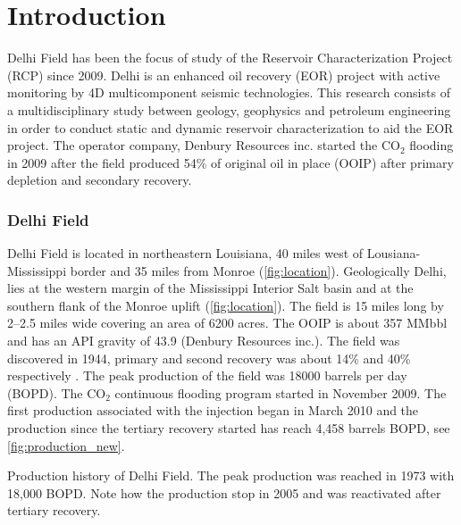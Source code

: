 \chapter{Introduction}
Delhi Field has been the focus of study of the Reservoir Characterization Project (RCP)
since 2009. Delhi is an enhanced oil recovery (EOR) project with 
active monitoring by 4D multicomponent seismic technologies. This research
consists of a multidisciplinary study 
between geology, geophysics and petroleum engineering in order to conduct  
static and dynamic reservoir characterization to aid the EOR project. 
The operator company, Denbury Resources inc. started the CO$_2$ flooding in 2009 after
the field produced 54\% of original oil in place (OOIP) after primary depletion and secondary recovery.


\subsection{Delhi Field}

Delhi Field is located in northeastern Louisiana, 40 miles west of 
Lousiana-Mississippi border \citep{ref:nick} and 35 miles from Monroe (\ref{fig:location}).
Geologically Delhi, lies at the western margin of the Mississippi Interior Salt basin
\citep{ref:alam} and at the southern flank of the Monroe uplift \citep{ref:bloomer} 
(\ref{fig:location}). The field is 15 miles long by 2--2.5 miles wide covering an
area of 6200 acres. The OOIP is about 357 MMbbl \citep{ref:powell} and has an API
 gravity of 43.9 (Denbury Resources inc.). 
The field was discovered in 1944, primary and second recovery was about 14\% and 40\%
respectively \citep{ref:bloomer}. The peak production of the field was 18000 barrels per day (BOPD). 
The CO$_2$ continuous flooding program started in November 2009.
The first production associated with the injection began
 in March 2010 and the production since the tertiary 
recovery started has reach 4,458 barrels BOPD, see \ref{fig:production_new}. 


                  {Production history of Delhi Field. The peak production was reached in
                   1973 with 18,000 BOPD. Note how the production stop in 2005 and was 
                   reactivated after tertiary recovery.}


